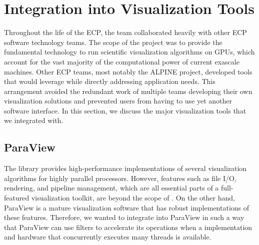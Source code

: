 \section{Integration into Visualization Tools}

Throughout the life of the ECP, the \vtkm team collaborated heavily with other ECP software technology teams.
The scope of the \vtkm project was to provide the fundamental technology to run scientific visualization algorithms on GPUs, which account for the vast majority of the computational power of current exascale machines.
Other ECP teams, most notably the ALPINE project, developed tools that would leverage \vtkm while directly addressing application needs.
This arrangement avoided the redundant work of multiple teams developing their own visualization solutions and prevented users from having to use yet another software interface.
In this section, we discuss the major visualization tools that we integrated \vtkm with.


\subsection{ParaView}

The \vtkm library provides high-performance implementations of several visualization algorithms for highly parallel processors.
However, features such as file I/O, rendering, and pipeline management, which are all essential parts of a full-featured visualization toolkit, are beyond the scope of \vtkm.
On the other hand, ParaView is a mature visualization software that has robust implementations of these features.
Therefore, we wanted to integrate \vtkm into ParaView in such a way that ParaView can use \vtkm filters to accelerate its operations when a \vtkm implementation and hardware that concurrently executes many threads is available.

